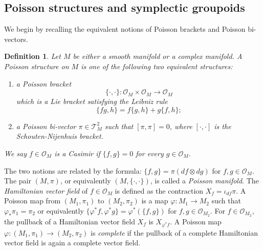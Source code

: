 \documentclass{amsart}
\newtheorem{definition}[theorem]{Definition}
\numberwithin{equation}{section}
\newcommand{\cA}{\mathcal{A}}
\newcommand{\cO}{\mathcal{O}}
\newcommand{\cT}{\mathcal{T}}
\newcommand{\cX}{\mathcal{X}}
\begin{document}

\subsection{Poisson structures and symplectic groupoids}
We begin by recalling the equivalent notions of Poisson brackets and Poisson bi-vectors.
\begin{definition} 
  \label{def: PoissonMfld}
  Let $M$ be either a smooth manifold or a complex manifold.
  A \emph{Poisson structure} on $M$ is one of the following two equivalent structures:
  \begin{enumerate}
    \item a \emph{Poisson bracket}
      $$\{\cdot, \cdot\}: \cO_M \times \cO_M \to \cO_M$$
      which is a Lie bracket satisfying the Leibniz rule
      $$\{fg, h\} = f\{g,h\} + g\{f,h\};$$
    \item a \emph{Poisson bi-vector} $\pi \in \cT^2_M$ such that $[\pi, \pi] = 0$, where $[\cdot, \cdot]$ is the Schouten-Nijenhuis bracket.
  \end{enumerate}
  We say $f \in \cO_M$ is a Casimir if $\{f, g\} = 0$ for every $g\in \cO_M$.
\end{definition}

The two notions are related by the formula: $\{f, g\} = \pi (df \otimes dg)$ for $f, g\in \cO_M$.
The pair $(M, \pi)$, or equivalently $(M, \{\cdot,\cdot\})$, is called a \emph{Poisson manifold}.
The \emph{Hamiltonian vector field} of $f \in \cO_M$ is defined as the contraction $X_f = \iota_{df}\pi$.
A Poisson map from $(M_1, \pi_1)$ to $(M_2, \pi_2)$ is a map $\varphi: M_1\to M_2$ such that $\varphi_*\pi_1 = \pi_2$ or equivalently $\{\varphi^*f, \varphi^*g\} = \varphi^*(\{f, g\})$ for $f, g \in \cO_{M_2}$.
For $f \in \cO_{M_2}$, the pullback of a Hamiltonian vector field $X_f$ is $X_{\varphi^*f}$.
A Poisson map $\varphi: (M_1, \pi_1) \to (M_2, \pi_2)$ is \emph{complete} if the pullback of a complete Hamiltonian vector field is again a complete vector field.
\end{document}

